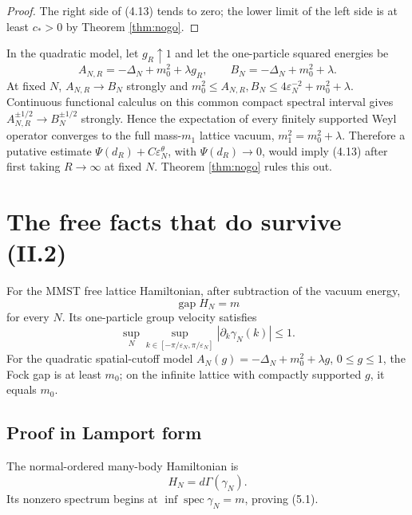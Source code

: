 \documentclass[11pt,a4paper]{article}
\newcommand{\eps}{\varepsilon}
\DeclareMathOperator{\gap}{gap}
\begin{document}
\begin{proof}
The right side of (4.13) tends to zero; the lower limit of the left side is at
least $c_*>0$ by Theorem \ref{thm:nogo}.
\end{proof}

\begin{remark}
In the quadratic model, let $g_R\uparrow1$ and let the one-particle squared
energies be
\[
 A_{N,R}=-\Delta_N+m_0^2+\lambda g_R,\qquad
 B_N=-\Delta_N+m_0^2+\lambda.
\]
At fixed $N$, $A_{N,R}\to B_N$ strongly and
$m_0^2\leq A_{N,R},B_N\leq 4\eps_N^{-2}+m_0^2+\lambda$.  Continuous functional
calculus on this common compact spectral interval gives
$A_{N,R}^{\pm1/2}\to B_N^{\pm1/2}$ strongly.  Hence the expectation of every
finitely supported Weyl operator converges to the full mass-$m_1$ lattice vacuum,
$m_1^2=m_0^2+\lambda$.  Therefore a putative estimate
$\Psi(d_R)+C\eps_N^\theta$, with $\Psi(d_R)\to0$, would imply (4.13) after first
taking $R\to\infty$ at fixed $N$.  Theorem \ref{thm:nogo} rules this out.
\end{remark}

\section{The free facts that do survive (II.2)}\label{sec:freefacts}

\begin{proposition}\label{prop:gap-velocity}
For the MMST free lattice Hamiltonian, after subtraction of the vacuum energy,
\[
 \gap H_N=m                                                       \tag{5.1}
\]
for every $N$.  Its one-particle group velocity satisfies
\[
 \sup_N\sup_{k\in[-\pi/\eps_N,\pi/\eps_N]}
 |\partial_k\gamma_N(k)|\leq1.                                  \tag{5.2}
\]
For the quadratic spatial-cutoff model
$A_N(g)=-\Delta_N+m_0^2+\lambda g$, $0\leq g\leq1$, the Fock gap is at least
$m_0$; on the infinite lattice with compactly supported $g$, it equals $m_0$.
\end{proposition}

\subsection*{Proof in Lamport form}


The normal-ordered many-body Hamiltonian is
\[
 H_N=d\Gamma(\gamma_N).
\]
Its nonzero spectrum begins at $\inf\operatorname{spec}\gamma_N=m$, proving
(5.1).
\end{document}
